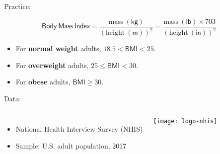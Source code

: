 \documentclass[t]{beamer}
\begin{document}
	
	
	\begin{frame}[t]{Practice: }

		$$\mathsf{Body~Mass~Index} = \frac{\mbox{mass} \ \mathsf{(kg)}}{\left( \mbox{height} \ (\mathsf{m})\right)^2} = \frac{\mbox{mass} \ \mathsf{(lb)} \times 703}{\left(\mbox{height} \ (\mathsf{in})\right)^2}$$
		
		\vspace{1em}

		\begin{itemize}
			\item For \textbf{normal weight} adults, $18.5 < \mathsf{BMI} < 25$.
			\item For \textbf{overweight} adults, $25 \leq \mathsf{BMI} < 30$.
			\item For \textbf{obese }adults, $\mathsf{BMI} \geq 30$.		
		\end{itemize}

		\vspace{1em}
		
    Data:
	
			\begin{columns}[c]
				
				\begin{itemize}
					\item National Health Interview Survey (NHIS)
					\item Sample: U.S. adult population, 2017
				\end{itemize}
	
				\texttt{[image: logo-nhis]}
			\end{columns}
	
	\end{frame}
\end{document}
